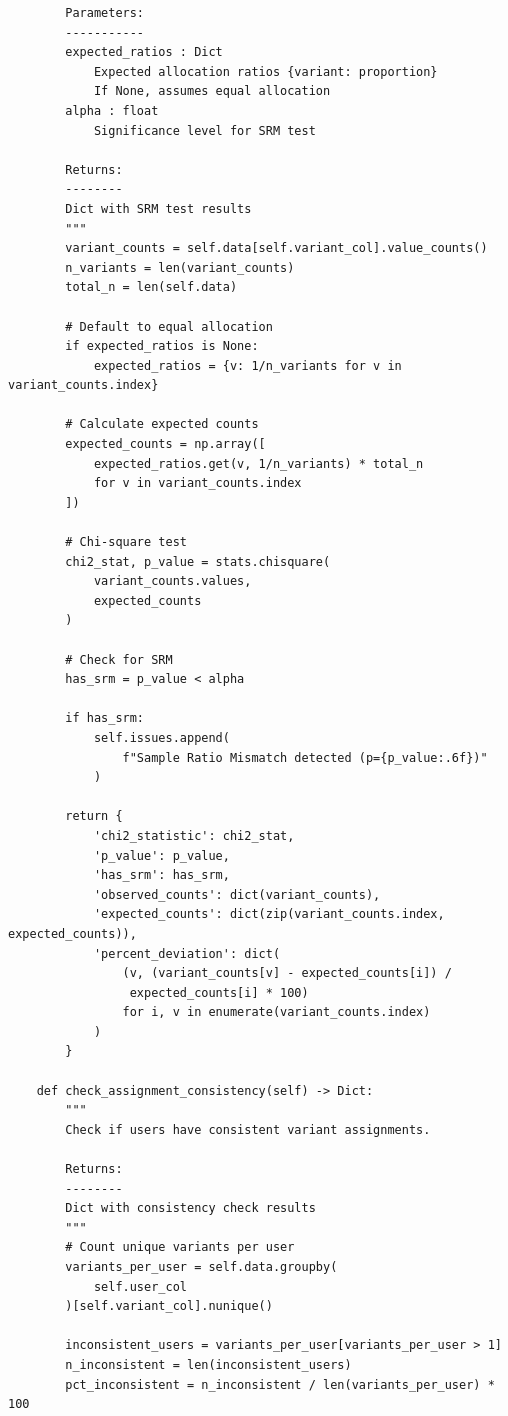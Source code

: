 \begin{lstlisting}
        Parameters:
        -----------
        expected_ratios : Dict
            Expected allocation ratios {variant: proportion}
            If None, assumes equal allocation
        alpha : float
            Significance level for SRM test

        Returns:
        --------
        Dict with SRM test results
        """
        variant_counts = self.data[self.variant_col].value_counts()
        n_variants = len(variant_counts)
        total_n = len(self.data)

        # Default to equal allocation
        if expected_ratios is None:
            expected_ratios = {v: 1/n_variants for v in variant_counts.index}

        # Calculate expected counts
        expected_counts = np.array([
            expected_ratios.get(v, 1/n_variants) * total_n
            for v in variant_counts.index
        ])

        # Chi-square test
        chi2_stat, p_value = stats.chisquare(
            variant_counts.values,
            expected_counts
        )

        # Check for SRM
        has_srm = p_value < alpha

        if has_srm:
            self.issues.append(
                f"Sample Ratio Mismatch detected (p={p_value:.6f})"
            )

        return {
            'chi2_statistic': chi2_stat,
            'p_value': p_value,
            'has_srm': has_srm,
            'observed_counts': dict(variant_counts),
            'expected_counts': dict(zip(variant_counts.index, expected_counts)),
            'percent_deviation': dict(
                (v, (variant_counts[v] - expected_counts[i]) /
                 expected_counts[i] * 100)
                for i, v in enumerate(variant_counts.index)
            )
        }

    def check_assignment_consistency(self) -> Dict:
        """
        Check if users have consistent variant assignments.

        Returns:
        --------
        Dict with consistency check results
        """
        # Count unique variants per user
        variants_per_user = self.data.groupby(
            self.user_col
        )[self.variant_col].nunique()

        inconsistent_users = variants_per_user[variants_per_user > 1]
        n_inconsistent = len(inconsistent_users)
        pct_inconsistent = n_inconsistent / len(variants_per_user) * 100


\end{lstlisting}
